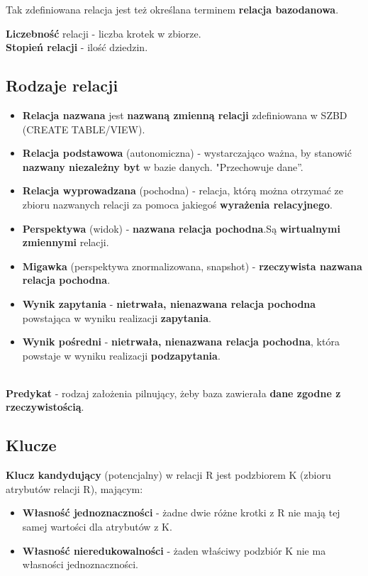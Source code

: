 \documentclass[a4paper]{article}
\begin{document}
Tak zdefiniowana relacja jest też określana terminem \textbf{relacja bazodanowa}.

\textbf{Liczebność} relacji - liczba krotek w zbiorze.\\
\textbf{Stopień relacji} - ilość dziedzin.\\

\subsection{Rodzaje relacji}
\begin{itemize}
    \item \textbf{Relacja nazwana} jest \textbf{nazwaną zmienną relacji} zdefiniowana w SZBD (CREATE TABLE/VIEW).
    \item \textbf{Relacja podstawowa} (autonomiczna) - wystarczająco ważna, by stanowić \textbf{nazwany niezależny byt} w bazie danych. "Przechowuje dane”.
    \item \textbf{Relacja wyprowadzana} (pochodna) - relacja, którą można otrzymać ze zbioru nazwanych relacji za pomoca jakiegoś \textbf{wyrażenia relacyjnego}.
    \item \textbf{Perspektywa} (widok) - \textbf{nazwana relacja pochodna}.Są \textbf{wirtualnymi zmiennymi} relacji.
    \item \textbf{Migawka} (perspektywa znormalizowana, snapshot) - \textbf{rzeczywista nazwana relacja pochodna}.
    \item \textbf{Wynik zapytania} - \textbf{nietrwała, nienazwana relacja pochodna} powstająca w wyniku realizacji \textbf{zapytania}.
    \item \textbf{Wynik pośredni} - \textbf{nietrwała, nienazwana relacja pochodna}, która powstaje w wyniku realizacji \textbf{podzapytania}.
\end{itemize}
\hfill \\
\textbf{Predykat} - rodzaj założenia pilnujący, żeby baza zawierała \textbf{dane zgodne z rzeczywistością}.

\subsection{Klucze}
\textbf{Klucz kandydujący} (potencjalny) w relacji R jest podzbiorem K (zbioru atrybutów relacji R), mającym:
\begin{itemize}
    \item \textbf{Własność jednoznaczności} - żadne dwie różne krotki z R nie mają tej samej wartości dla atrybutów z K.
    \item \textbf{Własność nieredukowalności} - żaden właściwy podzbiór K nie ma własności jednoznaczności. 
\end{itemize}
\end{document}
